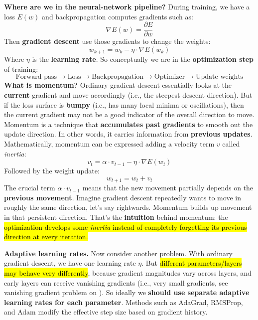 \highspace
\textcolor{Green3}{ \textbf{Where are we in the neural-network pipeline?}} During training, we have a loss $E(w)$ and backpropagation computes gradients such as:
\begin{equation*}
    \nabla E(w) = \frac{\partial E}{\partial w}
\end{equation*}
Then \textbf{gradient descent} use those gradients to change the weights:
\begin{equation*}
    w_{k+1} = w_k - \eta \cdot \nabla E(w_k)
\end{equation*}
Where $\eta$ is the \textbf{learning rate}. So conceptually we are in the \textbf{optimization step} of training:
\begin{equation*}
    \text{Forward pass} \to \text{Loss} \to \text{Backpropagation} \to \boxed{\text{Optimizer}} \to \text{Update weights}
\end{equation*}
\textcolor{Green3}{ \textbf{What is momentum?}} Ordinary gradient descent essentially looks at the \textbf{current} gradient and move accordingly (i.e., the steepest descent direction). But if the loss surface is \textbf{bumpy} (i.e., has many local minima or oscillations), then the current gradient may not be a good indicator of the overall direction to move. Momentum is a technique that \textbf{accumulates past gradients} to smooth out the update direction. In other words, it carries information from \textbf{previous updates}. Mathematically, momentum can be expressed adding a velocity term $v$ called \emph{inertia}:
\begin{equation*}
    v_{t} = \alpha \cdot v_{t-1} - \eta \cdot \nabla E(w_t)
\end{equation*}
Followed by the weight update:
\begin{equation*}
    w_{t+1} = w_t + v_t
\end{equation*}
The crucial term $\alpha \cdot v_{t-1}$ means that the new movement partially depends on the \textbf{previous movement}. Imagine gradient descent repeatedly wants to move in roughly the same direction, let's say rightwards. Momentum builds up movement in that persistent direction. That's the \textbf{intuition} behind momentum: the \hl{optimization develops some \emph{inertia} instead of completely forgetting its previous direction at every iteration.}

\highspace
\textcolor{Green3}{ \textbf{Adaptive learning rates.}} Now consider another problem. With ordinary gradient descent, we have one learning rate $\eta$. But \hl{different parameters/layers may behave very differently}, because gradient magnitudes vary across layers, and early layers can receive vanishing gradients (i.e., very small gradients, see vanishing gradient problem on ). So ideally we \textbf{should use separate adaptive learning rates for each parameter}. Methods such as AdaGrad, RMSProp, and Adam modify the effective step size based on gradient history.

